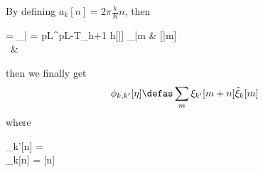 By defining $a_{k}[n] = 2\pi\frac{k}{K}n$, then
\begin{equations}
	\dh[l, \{k,k'\}] = \sum_{\bar{\eta} = pL}^{pL-T_h+1} h[\bar{\eta}] \sum_{\bar{m}} & \tilde{\psi}[\bar{m}] \cdot{} \\
	\times ~& 
\end{equations}
then we finally get
\begin{equation}
	\phi_{k,k'}[\eta] \defas \sum_{m} \xi_{k'}[m+n] \tilde{\xi}_{k}[m]
\end{equation}
where
\begin{subgather}
	\xi_{k'}[n] = \psi[n]   \\
	\tilde{\xi}_{k}[n] = \tilde{\psi}[n]  
\end{subgather}